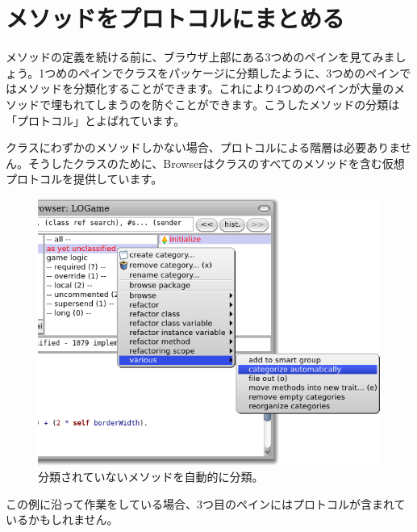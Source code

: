 \documentclass[a4paper,10pt,twoside]{book}
\begin{document}

\section{メソッドをプロトコルにまとめる}

メソッドの定義を続ける前に、ブラウザ上部にある3つめのペインを見てみましょう。1つめのペインでクラスをパッケージに分類したように、3つめのペインではメソッドを分類化することができます。これにより4つめのペインが大量のメソッドで埋もれてしまうのを防ぐことができます。こうしたメソッドの分類は「プロトコル」とよばれています。


クラスにわずかのメソッドしかない場合、プロトコルによる階層は必要ありません。そうしたクラスのために、Browserはクラスのすべてのメソッドを含む仮想プロトコルを提供しています。


\begin{figure}[htbp]
   \centering
   \includegraphics[width=\textwidth]{Categorize}
   \caption{分類されていないメソッドを自動的に分類。 }
\end{figure}

この例に沿って作業をしている場合、3つ目のペインにはプロトコルが含まれているかもしれません。
\end{document}
